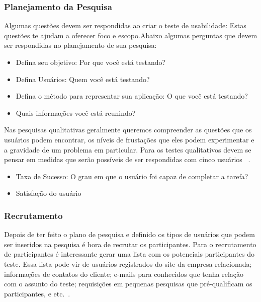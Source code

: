 \subsubsection {Planejamento da Pesquisa}

	Algumas questões devem ser respondidas ao criar o teste de usabilidade: Estas questões te ajudam a oferecer foco e escopo.Abaixo algumas perguntas que devem ser respondidas no planejamento de sua pesquisa:

\begin{itemize}
\item Defina seu objetivo: Por que você está testando? %
\item Defina Usuários: Quem você está testando? %
\item Defina o método para representar sua aplicação: O que você está testando?
\item Quais informações você está reunindo? 
\end{itemize}

Nas pesquisas qualitativas geralmente queremos compreender as questões que os usuários podem encontrar, os níveis de frustações que eles podem experimentar e a gravidade de um problema em particular. Para os testes qualitativos devem se pensar em medidas que serão possíveis de ser respondidas com cinco usuários ~\cite{unger2009}. 

\begin{itemize}
\item Taxa de Sucesso: O grau em que o usuário foi capaz de completar a tarefa?
\item Satisfação do usuário
\end{itemize}

\subsubsection{Recrutamento}

Depois de ter feito o plano de pesquisa e definido os tipos de usuários que podem ser inseridos na pesquisa é hora de recrutar os participantes.
Para o recrutamento de participantes é interessante gerar uma lista com os potenciais participantes do teste. Essa lista pode vir de usuários registrados do site da empresa relacionada; informações de contatos do cliente; e-mails para conhecidos que tenha relação com o assunto do teste; requisições em pequenas pesquisas que pré-qualificam os participantes, e etc.~\cite{unger2009}.

